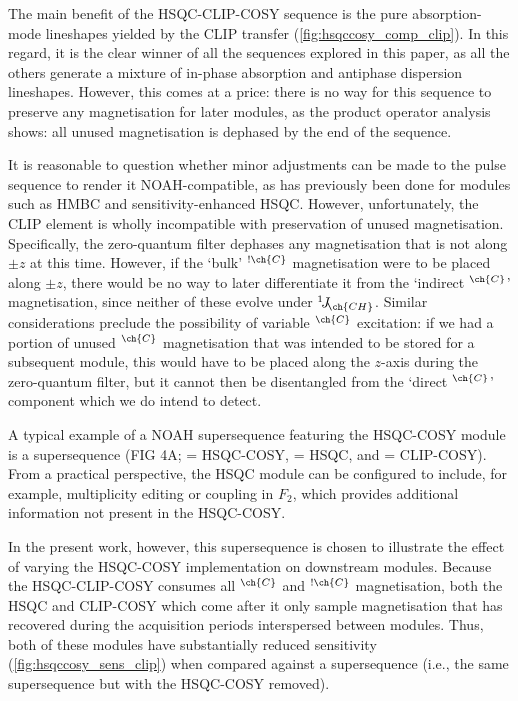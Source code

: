 \documentclass[a4paper,12pt]{article}
\newcommand{\magn}[1]{\ch{^1H}$^{\ch{#1}}$}
\newcommand{\magnnot}[1]{\ch{^1H}$^{!\ch{#1}}$}
\newcommand{\todo}[1]{{\color{OrangeRed}#1}}
\newcommand{\oneJ}[1]{{}^{1}\!J_{\!\ch{#1}}}
\begin{document}
\begin{refsection}
The main benefit of the HSQC-CLIP-COSY sequence is the pure absorption-mode lineshapes yielded by the CLIP transfer (\cref{fig:hsqccosy_comp_clip}).
In this regard, it is the clear winner of all the sequences explored in this paper, as all the others generate a mixture of in-phase absorption and antiphase dispersion lineshapes.
However, this comes at a price: there is no way for this sequence to preserve any magnetisation for later modules, as the product operator analysis shows: all unused magnetisation is dephased by the end of the sequence.

It is reasonable to question whether minor adjustments can be made to the pulse sequence to render it NOAH-compatible, as has previously been done for modules such as HMBC\autocite{Claridge2019MRC,Kupce2019JMR} and sensitivity-enhanced HSQC\autocite{Hansen2021AC,Yong2021JMR}.
However, unfortunately, the CLIP element is wholly incompatible with preservation of unused magnetisation.
Specifically, the zero-quantum filter dephases any magnetisation that is not along $\pm z$ at this time.
However, if the `bulk' \magnnot{C} magnetisation were to be placed along $\pm z$, there would be no way to later differentiate it from the `indirect \magn{C}' magnetisation, since neither of these evolve under $\oneJ{CH}$.
Similar considerations preclude the possibility of variable \magn{C} excitation: if we had a portion of unused \magn{C} magnetisation that was intended to be stored for a subsequent module, this would have to be placed along the $z$-axis during the zero-quantum filter, but it cannot then be disentangled from the `direct \magn{C}' component which we do intend to detect.

A typical example of a NOAH supersequence featuring the HSQC-COSY module is a  supersequence (\todo{FIG 4A};  = HSQC-COSY,  = HSQC, and  = CLIP-COSY).
From a practical perspective, the HSQC module can be configured to include, for example, multiplicity editing or coupling in $F_2$, which provides additional information not present in the HSQC-COSY.

In the present work, however, this supersequence is chosen to illustrate the effect of varying the HSQC-COSY implementation on downstream modules.
Because the HSQC-CLIP-COSY consumes all \magn{C} and \magnnot{C} magnetisation, both the HSQC and CLIP-COSY which come after it only sample magnetisation that has recovered during the acquisition periods interspersed between modules.
Thus, both of these modules have substantially reduced sensitivity (\cref{fig:hsqccosy_sens_clip}) when compared against a  supersequence (i.e., the same supersequence but with the HSQC-COSY removed).



\end{refsection}
\end{document}
